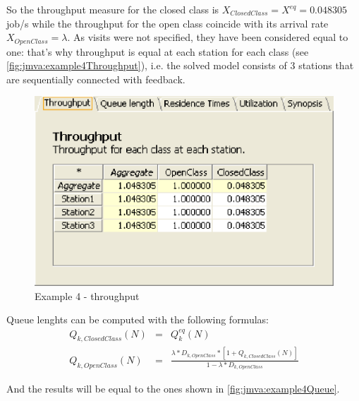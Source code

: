 So the throughput measure for the closed class is $X_{ClosedClass} =
X^{eq} = 0.048305$ job/s while the throughput for the open class
coincide with its arrival rate $X_{OpenClass} = \lambda$. As visits
were not specified, they have been considered equal to one: that's
why throughput is equal at each station for each class (see
\autoref{fig:jmva:example4Throughput}), i.e. the solved model
consists of 3 stations that are sequentially connected with
feedback.

\begin{figure}[htbp]
    \begin{center}
        \includegraphics[scale=.5]{img/jmva/example4Throughput}
    \end{center}
    \caption{Example 4 - throughput}
    \label{fig:jmva:example4Throughput}
\end{figure}

Queue lenghts can be computed with the following formulas:
\begin{eqnarray*}
Q_{k,ClosedClass}(N)&=&Q_k^{eq}(N)\\
Q_{k,OpenClass}(N)&=&\frac{\lambda*D_{k,OpenClass}*\left[1+Q_{k,ClosedClass}(N)\right]}{1-\lambda*D_{k,OpenClass}}
\end{eqnarray*}

And the results will be equal to the ones shown in
\autoref{fig:jmva:example4Queue}.

